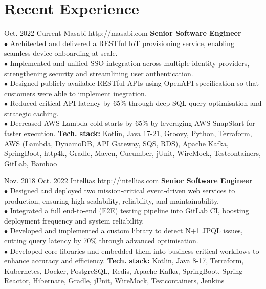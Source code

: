 \documentclass[10pt]{article} %
\begin{document}
\section{Recent Experience}
\job
{Oct. 2022 }{ Current}
{Masabi}
{http://masabi.com}
{\textbf{Senior Software Engineer}}
{
\textbf{}   
\\$\bullet$ Architected and delivered a RESTful IoT provisioning service, enabling seamless device onboarding at scale.
\\$\bullet$ Implemented and unified SSO integration across multiple identity providers, strengthening security and streamlining user authentication.
\\$\bullet$ Designed publicly available RESTful APIs using OpenAPI specification so that customers were able to implement inegration.
\\$\bullet$ Reduced critical API latency by 65\% through deep SQL query optimisation and strategic caching.
\\$\bullet$ Decreased AWS Lambda cold starts by 65\% by leveraging AWS SnapStart for faster execution.
\vadjust{\vspace{4pt}}
\newline
\textbf{Tech. stack: }{Kotlin, Java 17-21, Groovy, Python, Terraform, AWS (Lambda, DynamoDB, API Gateway, SQS, RDS), Apache Kafka, SpringBoot, http4k, Gradle, Maven, Cucumber, jUnit, WireMock, Testcontainers, GitLab, Bamboo}   
 }
 
 \job
{Nov. 2018 }{ Oct. 2022}
{Intellias}
{http://intellias.com}
{\textbf{Senior Software Engineer}}
{
\textbf{}   
\\$\bullet$ Designed and deployed two mission-critical event-driven web services to production, ensuring high scalability, reliability, and maintainability.
\\$\bullet$ Integrated a full end-to-end (E2E) testing pipeline into GitLab CI, boosting deployment frequency and system reliability.
\\$\bullet$ Developed and implemented a custom library to detect N+1 JPQL issues, cutting query latency by 70\% through advanced optimisation.
\\$\bullet$ Developed core libraries and embedded them into business-critical workflows to enhance accuracy and efficiency.
\vadjust{\vspace{4pt}}
\newline
\textbf{Tech. stack: }{Kotlin, Java 8-17, Terraform, Kubernetes, Docker, PostgreSQL, Redis, Apache Kafka, SpringBoot, Spring Reactor, Hibernate, Gradle, jUnit, WireMock, Testcontainers, Jenkins}   
 }
\end{document}
